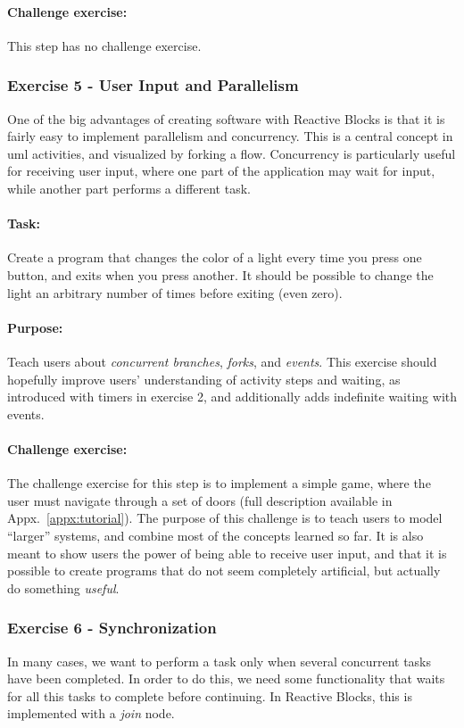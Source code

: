 \paragraph{Challenge exercise:} This step has no challenge exercise.

\subsubsection{Exercise 5 - User Input and Parallelism}
One of the big advantages of creating software with Reactive Blocks is that it is fairly easy to implement parallelism and concurrency. This is a central concept in \gls{uml} activities, and visualized by forking a flow. Concurrency is particularly useful for receiving user input, where one part of the application may wait for input, while another part performs a different task.

\paragraph{Task:} Create a program that changes the color of a light every time you press one button, and exits when you press another. It should be possible to change the light an arbitrary number of times before exiting (even zero).

\paragraph{Purpose:} Teach users about \emph{concurrent branches}, \emph{forks}, and \emph{events}. This exercise should hopefully improve users' understanding of activity steps and waiting, as introduced with timers in exercise 2, and additionally adds indefinite waiting with events.

\paragraph{Challenge exercise:} The challenge exercise for this step is to implement a simple game, where the user must navigate through a set of doors (full description available in Appx.~\ref{appx:tutorial}). The purpose of this challenge is to teach users to model ``larger'' systems, and combine most of the concepts learned so far. It is also meant to show users the power of being able to receive user input, and that it is possible to create programs that do not seem completely artificial, but actually do something \emph{useful}.

\subsubsection{Exercise 6 - Synchronization}
In many cases, we want to perform a task only when several concurrent tasks have been completed. In order to do this, we need some functionality that waits for all this tasks to complete before continuing. In Reactive Blocks, this is implemented with a \emph{join} node.

